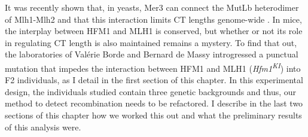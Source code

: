 \begin{mccorrection}
It was recently shown that, in yeasts, Mer3 can connect the MutL\textgreek{b} heterodimer of Mlh1-Mlh2 and that this interaction limits CT lengths genome-wide \citep{duroc2017concerted}.
In mice, the interplay between HFM1 and MLH1 is conserved, but whether or not its role in regulating CT length is also maintained remains a mystery.
To find that out, the laboratories of Valérie Borde and Bernard de Massy introgressed a punctual mutation that impedes the interaction between HFM1 and MLH1 (\textit{Hfm1\textsuperscript{KI}}) into F2 individuals, as I detail in the first section of this chapter.
In this experimental design, the individuals studied contain three genetic backgrounds and thus, our method to detect recombination needs to be refactored.
I describe in the last two sections of this chapter how we worked this out and what the preliminary results of this analysis were.
\end{mccorrection}

